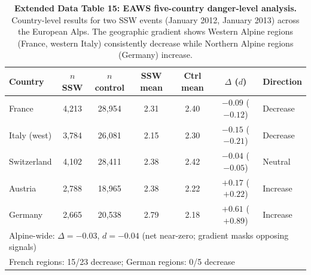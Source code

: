 \documentclass[11pt,letterpaper]{article}
\begin{document}
\begin{table}[!ht]
\centering
\caption{\textbf{Extended Data Table 15: EAWS five-country danger-level analysis.}
Country-level results for two SSW events (January 2012, January 2013) across the European Alps. The geographic gradient shows Western Alpine regions (France, western Italy) consistently decrease while Northern Alpine regions (Germany) increase.}
\label{tab:eaws}
\small
\begin{tabular}{lcccccl}
\toprule
Country & $n$ SSW & $n$ control & SSW mean & Ctrl mean & $\Delta$ ($d$) & Direction \\
\midrule
France & 4,213 & 28,954 & 2.31 & 2.40 & $-0.09$ ($-0.12$) & Decrease \\
Italy (west) & 3,784 & 26,081 & 2.15 & 2.30 & $-0.15$ ($-0.21$) & Decrease \\
Switzerland & 4,102 & 28,411 & 2.38 & 2.42 & $-0.04$ ($-0.05$) & Neutral \\
Austria & 2,788 & 18,965 & 2.38 & 2.22 & $+0.17$ ($+0.22$) & Increase \\
Germany & 2,665 & 20,538 & 2.79 & 2.18 & $+0.61$ ($+0.89$) & Increase \\
\midrule
\multicolumn{7}{l}{Alpine-wide: $\Delta = -0.03$, $d = -0.04$ (net near-zero; gradient masks opposing signals)} \\
\multicolumn{7}{l}{French regions: 15/23 decrease; German regions: 0/5 decrease} \\
\bottomrule
\end{tabular}
\end{table}
\end{document}
